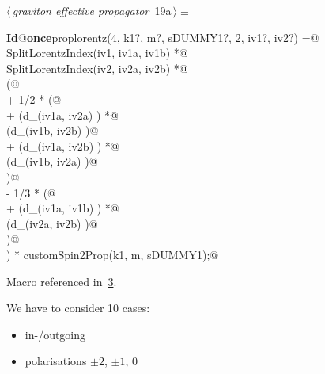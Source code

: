 \documentclass[a4paper,12pt]{amsart}
\renewcommand{\NWtarget}[2]{\hypertarget{#1}{#2}}
\renewcommand{\NWlink}[2]{\hyperlink{#1}{#2}}
\renewcommand{\NWtxtMacroRefIn}{Macro referenced in}
\renewcommand{\NWsep}{${\diamond}$}
\begin{document}
\begin{flushleft} \small
\begin{minipage}{\linewidth}\label{scrap39}\raggedright\small
\NWtarget{nuweb19a}{} $\langle\,${\itshape graviton effective propagator}\nobreak\ {\footnotesize {19a}}$\,\rangle\equiv$
\vspace{-1ex}
\begin{list}{}{} \item
\mbox{}\verb@@\hbox{\sffamily\bfseries Id}\verb@ @\hbox{\sffamily\bfseries once}\verb@ proplorentz(4, k1?, m?, sDUMMY1?, 2, iv1?, iv2?) =@\\
\mbox{}\verb@   SplitLorentzIndex(iv1, iv1a, iv1b) *@\\
\mbox{}\verb@   SplitLorentzIndex(iv2, iv2a, iv2b) *@\\
\mbox{}\verb@   (@\\
\mbox{}\verb@        + 1/2 * (@\\
\mbox{}\verb@                + (d_(iv1a, iv2a) ) *@\\
\mbox{}\verb@                  (d_(iv1b, iv2b) )@\\
\mbox{}\verb@                + (d_(iv1a, iv2b) ) *@\\
\mbox{}\verb@                  (d_(iv1b, iv2a) )@\\
\mbox{}\verb@        )@\\
\mbox{}\verb@        - 1/3 * (@\\
\mbox{}\verb@                + (d_(iv1a, iv1b) ) *@\\
\mbox{}\verb@                  (d_(iv2a, iv2b) )@\\
\mbox{}\verb@        )@\\
\mbox{}\verb@   ) * customSpin2Prop(k1, m, sDUMMY1);@\\
\mbox{}\verb@@{\NWsep}
\end{list}
\vspace{-1.5ex}
\footnotesize
\begin{list}{}{\setlength{\itemsep}{-\parsep}\setlength{\itemindent}{-\leftmargin}}
\item \NWtxtMacroRefIn\ \NWlink{nuweb3}{3}.

\item{}
\end{list}
\end{minipage}\vspace{4ex}
\end{flushleft}
We have to consider 10 cases:
\begin{itemize}
\item in-/outgoing
\item polarisations $\pm2$, $\pm1$, $0$
\end{itemize}
\end{document}
